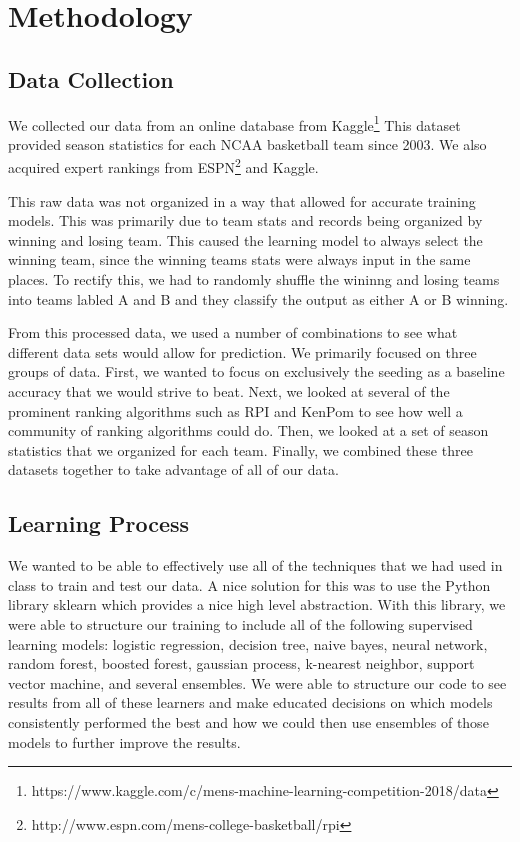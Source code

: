 \section{Methodology}

\subsection{Data Collection}
We collected our data from an online database from Kaggle\footnote{https://www.kaggle.com/c/mens-machine-learning-competition-2018/data}
This dataset provided season statistics for each NCAA basketball team since 2003.
We also acquired expert rankings from ESPN\footnote{http://www.espn.com/mens-college-basketball/rpi} and Kaggle.

This raw data was not organized in a way that allowed for accurate training models.
This was primarily due to team stats and records being organized by winning and losing team.
This caused the learning model to always select the winning team, since the winning teams stats were always input in the same places.
To rectify this, we had to randomly shuffle the wininng and losing teams into teams labled A and B and they classify the output as either A or B winning.

From this processed data, we used a number of combinations to see what different data sets would allow for prediction.
We primarily focused on three groups of data. 
First, we wanted to focus on exclusively the seeding as a baseline accuracy that we would strive to beat.
Next, we looked at several of the prominent ranking algorithms such as RPI and KenPom to see how well a community of ranking algorithms could do.
Then, we looked at a set of season statistics that we organized for each team. 
Finally, we combined these three datasets together to take advantage of all of our data.

\subsection{Learning Process}
We wanted to be able to effectively use all of the techniques that we had used in class to train and test our data.
A nice solution for this was to use the Python library sklearn which provides a nice high level abstraction.
With this library, we were able to structure our training to include all of the following supervised learning models: logistic regression, decision tree, naive bayes, neural network, random forest, boosted forest, gaussian process, k-nearest neighbor, support vector machine, and several ensembles.
We were able to structure our code to see results from all of these learners and make educated decisions on which models consistently performed the best and how we could then use ensembles of those models to further improve the results.